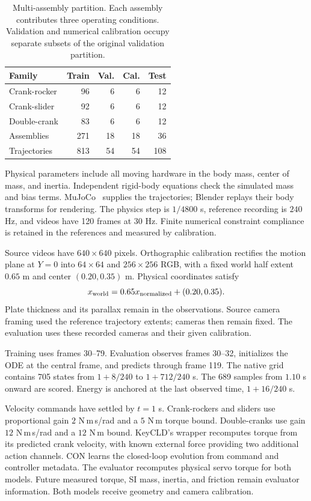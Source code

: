 \documentclass[10pt,twocolumn,letterpaper]{article}
\begin{document}
\begin{table}[t]
\caption{Multi-assembly partition. Each assembly contributes three operating conditions. Validation and numerical calibration occupy separate subsets of the original validation partition.}
\label{app:corpus-splits}
\centering\small
\begin{tabular}{lrrrr}
\toprule
Family & Train & Val. & Cal. & Test\\
\midrule
Crank-rocker & 96 & 6 & 6 & 12\\
Crank-slider & 92 & 6 & 6 & 12\\
Double-crank & 83 & 6 & 6 & 12\\
\midrule
Assemblies & 271 & 18 & 18 & 36\\
Trajectories & 813 & 54 & 54 & 108\\
\bottomrule
\end{tabular}
\end{table}

Physical parameters include all moving hardware in the body mass, center of mass, and inertia. Independent rigid-body equations check the simulated mass and bias terms. MuJoCo~\cite{todorov2012mujoco} supplies the trajectories; Blender replays their body transforms for rendering. The physics step is $1/4800$ s, reference recording is $240$ Hz, and videos have 120 frames at $30$ Hz. Finite numerical constraint compliance is retained in the references and measured by calibration.

Source videos have $640\times640$ pixels. Orthographic calibration rectifies the motion plane at $Y=0$ into $64\times64$ and $256\times256$ RGB, with a fixed world half extent $0.65$ m and center $(0.20,0.35)$ m. Physical coordinates satisfy
\begin{equation}
x_{\rm world}=0.65x_{\rm normalized}+(0.20,0.35).
\end{equation}
Plate thickness and its parallax remain in the observations. Source camera framing used the reference trajectory extents; cameras then remain fixed. The evaluation uses these recorded cameras and their given calibration.

Training uses frames 30--79. Evaluation observes frames 30--32, initializes the ODE at the central frame, and predicts through frame 119. The native grid contains 705 states from $1+8/240$ to $1+712/240$ s. The 689 samples from $1.10$ s onward are scored. Energy is anchored at the last observed time, $1+16/240$ s.

Velocity commands have settled by $t=1$ s. Crank-rockers and sliders use proportional gain $2$ N\,m\,s/rad and a $5$ N\,m torque bound. Double-cranks use gain $12$ N\,m\,s/rad and a $12$ N\,m bound. KeyCLD's wrapper recomputes torque from its predicted crank velocity, with known external force providing two additional action channels. CON learns the closed-loop evolution from command and controller metadata. The evaluator recomputes physical servo torque for both models. Future measured torque, SI mass, inertia, and friction remain evaluator information. Both models receive geometry and camera calibration.
\end{document}
